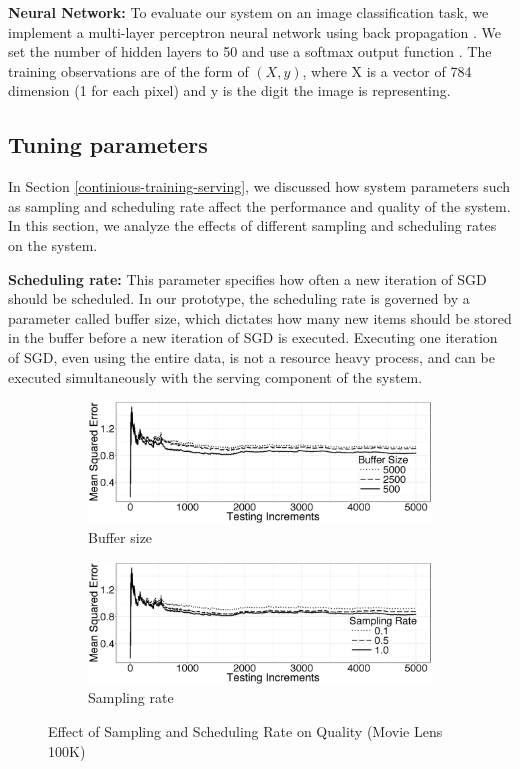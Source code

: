 \documentclass{vldb}
\begin{document}
\textbf{Neural Network:} To evaluate our system on an image classification task, we implement a multi-layer perceptron neural network using back propagation \cite{collobert2004links}.
We set the number of hidden layers to 50 and use a softmax output function \cite{bishop2006pattern}.
The training observations are of the form of \textit{\((X,y)\)}, where X is a vector of 784 dimension (1 for each pixel) and y is the digit the image is representing.

\subsection{Tuning parameters} \label{tuning}
In Section \ref{continious-training-serving}, we discussed how system parameters such as sampling and scheduling rate affect the performance and quality of the system.
In this section, we analyze the effects of different sampling and scheduling rates on the system.

\textbf{Scheduling rate:} This parameter specifies how often a new iteration of SGD should be scheduled. 
In our prototype, the scheduling rate is governed by a parameter called buffer size, which dictates how many new items should be stored in the buffer before a new iteration of SGD is executed. 
Executing one iteration of SGD, even using the entire data, is not a resource heavy process, and can be executed simultaneously with the serving component of the system. 

\begin{figure}[h]
\begin{subfigure}{\columnwidth}
\centering
\includegraphics[width=\columnwidth]{../images/experiment-results/movie-lens-buffer-quality-improved.eps}
\caption{Buffer size}
\label{fig:movie-lens-100k-buffer-size-mse}
\end{subfigure}
\begin{subfigure}{\columnwidth}
\centering
\includegraphics[width=\columnwidth]{../images/experiment-results/movie-lens-sampling-quality-improved.eps}
\caption{Sampling rate}
\label{fig:movie-lens-100k-sample-rate}
\end{subfigure}
\vspace{2mm}
\caption{Effect of Sampling and Scheduling Rate on Quality (Movie Lens 100K)}
\end{figure}
\end{document}
